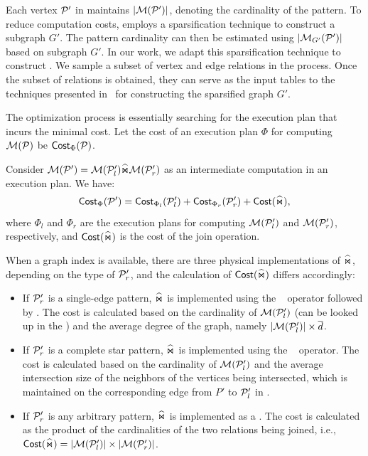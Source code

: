  Each vertex $\mathcal{P}'$ in \glogue maintains $|\mathcal{M}(\mathcal{P}')|$, denoting the cardinality of the pattern. To reduce computation costs, \glogs employs a sparsification technique to construct a subgraph $G'$. The pattern cardinality can then be estimated using $|\mathcal{M}_{G'}(\mathcal{P}')|$ based on subgraph $G'$. In our work, we adapt this sparsification technique to construct \glogue. We sample a subset of vertex and edge relations in the \rgmapping process. Once the subset of relations is obtained, they can serve as the input tables to the techniques presented in~\cite{gart} for constructing the sparsified graph $G'$.


 The optimization process is essentially searching for the execution plan that incurs the minimal cost. Let the cost of an execution plan $\Phi$ for computing $\mathcal{M}(\mathcal{P})$ be ${\mathsf{Cost}}_\Phi(\mathcal{P})$. %

Consider $\mathcal{M}(\mathcal{P}') = \mathcal{M}(\mathcal{P}'_l) \widehat{\Join} \mathcal{M}(\mathcal{P}'_r)$ as an intermediate computation in an execution plan. We have:
\[
{\mathsf{Cost}}_{\Phi}(\mathcal{P}') = {\mathsf{Cost}}_{\Phi_l}(\mathcal{P}'_l) + {\mathsf{Cost}}_{\Phi_r}(\mathcal{P}'_r) + {\mathsf{Cost}}(\widehat{\Join}),
\]
where $\Phi_l$ and $\Phi_r$ are the execution plans for computing $\mathcal{M}(\mathcal{P}'_l)$ and $\mathcal{M}(\mathcal{P}'_r)$, respectively, and ${\mathsf{Cost}}(\widehat{\Join})$ is the cost of the join operation.

When a graph index is available, there are three physical implementations of $\widehat{\Join}$, depending on the type of $\mathcal{P}'_r$, and the calculation of ${\mathsf{Cost}}(\widehat{\Join})$ differs accordingly:
\begin{itemize}
\item If $\mathcal{P}'_r$ is a single-edge pattern, $\widehat{\Join}$ is implemented using the \expandedge~ operator followed by \getvertex. The cost is calculated based on the cardinality of $\mathcal{M}(\mathcal{P}'_l)$ (can be looked up in the \glogue) and the average degree of the graph, namely $|\mathcal{M}(\mathcal{P}'_l)| \times \overline{d}$.
\item If $\mathcal{P}'_r$ is a complete star pattern, $\widehat{\Join}$ is implemented using the \expandintersect~ operator. The cost is calculated based on the cardinality of $\mathcal{M}(\mathcal{P}'_l)$ and the average intersection size of the neighbors of the vertices being intersected, which is maintained on the corresponding edge from $P'$ to $\mathcal{P}'_l$ in \glogue.
\item  If $\mathcal{P}'_r$ is any arbitrary pattern, $\widehat{\Join}$ is implemented as a \hashjoin. The cost is calculated as the product of the cardinalities of the two relations being joined, i.e., ${\mathsf{Cost}}(\widehat{\Join}) = |\mathcal{M}(\mathcal{P}'_l)| \times |\mathcal{M}(\mathcal{P}'_r)|$.
\end{itemize}

